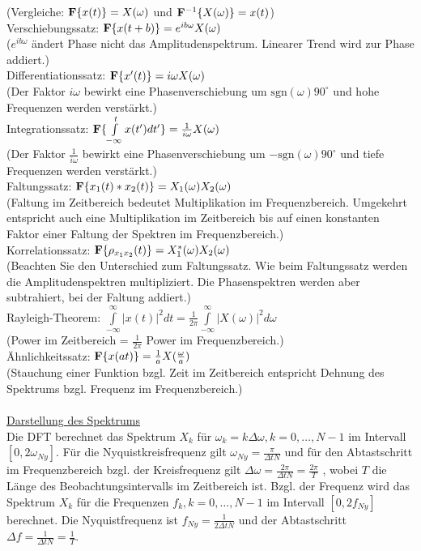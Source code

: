 (Vergleiche: ${\bf F} \{x(t)\}=X(\omega)$ und $ {\bf F}^{-1}\{X(\omega)\}=x(t)$)\\
Verschiebungssatz: ${\bf F} \{x(t+b)\}=e^{ib\omega}X(\omega)$\\
($e^{ib\omega}$ ändert Phase nicht das Amplitudenspektrum. Linearer Trend wird zur Phase addiert.)\\
Differentiationssatz: ${\bf F}\{x^\prime(t)\}=i\omega X(\omega)$\\
(Der Faktor $i \omega $ bewirkt eine Phasenverschiebung um $\mbox{sgn}(\omega) 90^\circ$ und hohe Frequenzen werden verstärkt.)\\
Integrationssatz: ${\bf F} \{\int\limits_{-\infty}^{t} x(t')dt'\}=\frac{1}{i\omega} X(\omega)$\\
(Der Faktor $\frac{1}{i\omega}$ bewirkt eine Phasenverschiebung um $-\mbox{sgn}(\omega) 90^\circ$ und tiefe Frequenzen werden verstärkt.)\\
Faltungssatz: ${\bf F} \{x_1(t) \ast x_2(t)\}= X_1(\omega) X_2(\omega)$\\
(Faltung im Zeitbereich bedeutet Multiplikation im Frequenzbereich. Umgekehrt entspricht auch eine Multiplikation im Zeitbereich bis auf einen konstanten Faktor einer Faltung der Spektren im Frequenzbereich.)\\
Korrelationssatz: ${\bf F} \{\rho_{x_1x_2}(t)\}= X_1^\ast(\omega) X_2(\omega)$\\
(Beachten Sie den Unterschied zum Faltungssatz. Wie beim Faltungssatz werden die Amplitudenspektren multipliziert. Die Phasenspektren werden aber subtrahiert, bei der Faltung addiert.)\\
Rayleigh-Theorem: $\int\limits_{-\infty}^{\infty} | x(t) |^2 dt = \frac{1}{2\pi} \int\limits_{-\infty}^{\infty} | X(\omega)|^2 d\omega$\\
(Power im Zeitbereich = $\frac{1}{2\pi}$ Power im Frequenzbereich.)\\
Ähnlichkeitssatz: ${\bf F} \{x(at)\}= \frac{1}{a} X(\frac{\omega}{a})$\\ 
(Stauchung einer Funktion bzgl. Zeit im Zeitbereich entspricht Dehnung des Spektrums bzgl. Frequenz im Frequenzbereich.)
\\
\\
\underline{Darstellung des Spektrums}\\
Die DFT berechnet das Spektrum $X_k$ für $\omega_k= k \Delta \omega, k=0,\dots, N-1$ im Intervall $[0,2\omega_{Ny}]$. Für die Nyquistkreisfrequenz gilt $\omega_{Ny} = \frac {\pi} {\Delta t N}$ und für den Abtastschritt im Frequenzbereich bzgl. der Kreisfrequenz gilt $\Delta\omega=\frac{2\pi}{\Delta t N} = \frac{2\pi}{T}$ , wobei $T$ die Länge des Beobachtungsintervalls im Zeitbereich ist. Bzgl. der Frequenz wird das Spektrum $X_k$ für die Frequenzen  $f_k, k=0,\dots, N-1$ im Intervall $[0,2f_{Ny}]$ berechnet. Die Nyquistfrequenz ist  $f_{Ny} = \frac {1} {2 \Delta t N}$ und der Abtastschritt $\Delta f =\frac{1}{\Delta t N} = \frac{1}{T}$.\\
